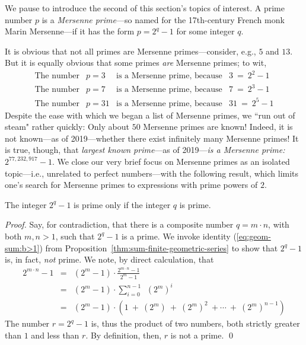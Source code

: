 \bigskip

  
We pause to introduce the second of this section's topics of interest.   A prime number $p$ is a {\it Mersenne prime}---so named for the 17th-century French monk Marin  Mersenne---if it has the form $p = 2^q -1$ for some integer $q$.

\smallskip

It is obvious that not all primes are Mersenne primes---consider, e.g., $5$ and $13$.  But it is equally obvious that some primes {\em are} Mersenne primes; to wit,
\begin{equation}
\label{eq:sample-mersennes}
\begin{array}{lclc}
\mbox{The number} & p=3 & 
  \mbox{is a Mersenne prime, because} & 3 \ = \ 2^2 -1 \\
\mbox{The number} & p=7 &
  \mbox{is a Mersenne prime, because} & 7 \ = \ 2^3 -1 \\
\mbox{The number} & p=31 &
  \mbox{is a Mersenne prime, because} & 31 \ = \ 2^5 -1
\end{array}
\end{equation}
Despite the ease with which we began a list of Mersenne primes,  we ``run out of steam" rather quickly:  Only about $50$ Mersenne primes are known!  Indeed, it is not known---as of 2019---whether there exist infinitely many Mersenne primes!  It is true, though, that {\em largest known prime}---as of 2019---{\em is a Mersenne prime:} $2^{77,232,917} -1$.   We close our very brief focus on Mersenne primes as an isolated topic---i.e., unrelated to perfect numbers---with the following result, which limits one's search for Mersenne primes to expressions with prime powers of $2$.

\begin{prop}
\label{thm:Mersenne-needs-prime-exponent}
The integer $2^q -1$ is prime only if the integer $q$ is prime.
\end{prop}

\begin{proof}
Say, for contradiction, that there is a composite number $q = m \cdot n$, with both $m, n > 1$, such that $2^q -1$ is a prime.  We invoke identity (\ref{eq:geom-sum:b>1}) from Proposition~\ref{thm:sum-finite-geometric-series} to show that $2^q -1$ is, in fact, {\em not} prime.  We note, by direct calculation, that
\begin{eqnarray}
\nonumber
2^{m \cdot n} -1 & = & (2^m -1) \cdot \frac{2^{m \cdot n} -1}{2^m -1} \\
\nonumber
  & = & (2^m -1) \cdot \sum_{i=0}^{n-1} \ \ (2^m)^{i} \\
\label{eq:Mersenne-factors}
  & = & (2^m -1) \cdot \left( 1 \ + \ (2^m) \ + \ (2^m)^2 \ + \cdots
            \ + \ (2^m)^{n-1} \right)
\end{eqnarray}
The number $r = 2^q - 1$ is, thus the product of two numbers, both strictly greater than $1$ and less than $r$.  By definition, then, $r$ is not a prime.  \qed
\end{proof}

